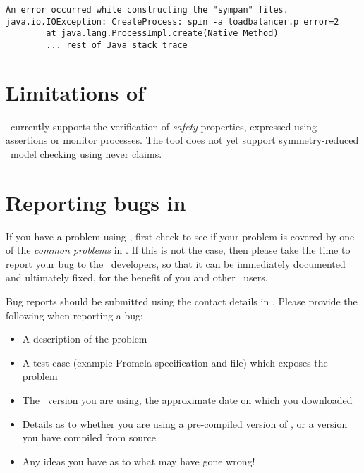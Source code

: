 \exampleerrormessage

\begin{lstlisting}
An error occurred while constructing the "sympan" files.
java.io.IOException: CreateProcess: spin -a loadbalancer.p error=2
        at java.lang.ProcessImpl.create(Native Method)
        ... rest of Java stack trace
\end{lstlisting}



%
%
%
%

\section{Limitations of \protect\topspin}
%
\topspin\ currently supports the verification of \emph{safety}
properties, expressed using assertions or monitor processes.  The
tool does not yet support symmetry-reduced \ltl\ model checking
using never claims.
%
\section{Reporting bugs in \protect\topspin}\label{sec:troubleshooting:reportingbugs}
%
If you have a problem using \topspin, first check to see if your
problem is covered by one of the \emph{common problems} in
.  If this is not the case, then
please take the time to report your bug to the \topspin\ developers,
so that it can be immediately documented and ultimately fixed, for
the benefit of you and other \topspin\ users.

Bug reports should be submitted using the contact details in
.  Please provide the
following when reporting a bug:

\begin{itemize}
\item A description of the problem
\item A test-case (example Promela specification and  file) which exposes the problem
\item The \topspin\ version you are using, the approximate date on which you downloaded \topspin
\item Details as to whether you are using a pre-compiled version of \topspin, or a version you have compiled from source
\item Any ideas you have as to what may have gone wrong!
\end{itemize}

